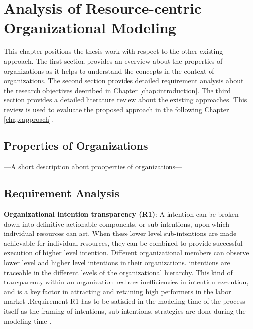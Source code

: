 \chapter{Analysis of Resource-centric Organizational Modeling}
\label{chap:analysis}

This chapter positions the thesis work with respect to the other existing approach. The first section provides an overview about the properties of organizations as it helps to understand the concepts in the context of organizations. The second section provides detailed requirement analysis about the research objectives described in Chapter \ref{chap:introduction}. The third section provides a detailed literature review about the existing approaches. This review is used to evaluate the proposed approach in the following Chapter \ref{chap:approach}.



\section{Properties of Organizations}
\label{sec:propertiesorganization}
---A short description about prooperties of organizations---


\section{Requirement Analysis}
\label{sec:requirementssupoorting}

 \textbf{Organizational intention transparency (R1)}:  A intention can be broken down into definitive actionable components, or sub-intentions, upon which individual resources can act. When these lower level sub-intentions are made  achievable for individual resources, they can be combined to provide successful execution of higher level intention. Different organizational members can observe lower level and higher level intentions in their organizations. intentions are traceable in the different levels of the organizational hierarchy. This kind of transparency within an organization reduces inefficiencies in intention execution, and is a key factor in attracting and retaining high  performers in the labor market \cite{McManus2007}.Requirement R1 has to be satisfied in the modeling time of the process itself as the framing of intentions, sub-intentions, strategies are done during the modeling time .


